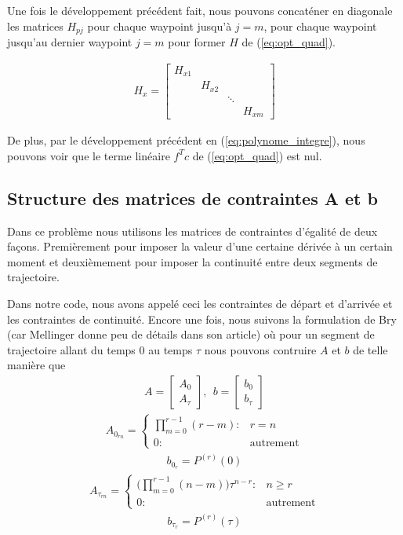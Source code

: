 Une fois le développement précédent fait, nous pouvons concaténer en diagonale les matrices $H_{pj}$ pour chaque waypoint jusqu'à $j=m$, pour chaque waypoint jusqu'au dernier waypoint $j=m$ pour former $H$ de (\ref{eq:opt_quad}).

\begin{align}
H_x=
\begin{bmatrix}
	H_{x1} \\
	&	H_{x2} \\
	&	&		\ddots \\
	&	&		&		H_{xm}
\end{bmatrix}
\end{align}

De plus, par le développement précédent en (\ref{eq:polynome_integre}), nous pouvons voir que le terme linéaire $f^Tc$ de (\ref{eq:opt_quad}) est nul.

\subsection{Structure des matrices de contraintes A et b}

Dans ce problème nous utilisons les matrices de contraintes d'égalité de deux façons. Premièrement pour imposer la valeur d'une certaine dérivée à un certain moment et deuxièmement pour imposer la continuité entre deux segments de trajectoire.

Dans notre code, nous avons appelé ceci les contraintes de départ et d'arrivée et les contraintes de continuité. Encore une fois, nous suivons la formulation de Bry \cite{bry2012control}(car Mellinger donne peu de détails dans son article) où pour un segment de trajectoire allant du temps $0$ au temps $\tau$ nous pouvons contruire $A$ et $b$ de telle manière que
\begin{align}
A = \begin{bmatrix} A_0 \\ A_\tau \end{bmatrix},\ \ b = \begin{bmatrix} b_0 \\ b_\tau \end{bmatrix}
\end{align}
\begin{align}
A_{0_{rn}} = \left\{
  \begin{array}{ll}
    \prod_{m = 0}^{r-1} (r-m): & r = n \\
    0 : & \text{autrement}
  \end{array}
\right.
\end{align}
\begin{align}
b_{0_r} = P^{(r)}(0)
\end{align}
\begin{align}
A_{\tau_{rn}} = \left\{
  \begin{array}{ll}
    \big(\prod_{m = 0}^{r-1} (n-m) \Big) \tau^{n-r} : & n \geq r \\
    0 : & \text{autrement}
  \end{array}
\right.
\end{align}
\begin{align}
b_{\tau_r} = P^{(r)}(\tau)
\end{align}

